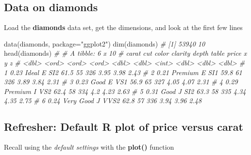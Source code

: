 \documentclass[
]{article}
\newenvironment{Shaded}{\begin{snugshade}}{\end{snugshade}}
\newcommand{\AttributeTok}[1]{\textcolor[rgb]{0.77,0.63,0.00}{#1}}
\newcommand{\CommentTok}[1]{\textcolor[rgb]{0.56,0.35,0.01}{\textit{#1}}}
\newcommand{\FunctionTok}[1]{\textcolor[rgb]{0.00,0.00,0.00}{#1}}
\newcommand{\NormalTok}[1]{#1}
\newcommand{\SpecialCharTok}[1]{\textcolor[rgb]{0.00,0.00,0.00}{#1}}
\newcommand{\StringTok}[1]{\textcolor[rgb]{0.31,0.60,0.02}{#1}}
\begin{document}
\hypertarget{data-on-diamonds}{%
\subsection{Data on diamonds}\label{data-on-diamonds}}

Load the \textbf{diamonds} data set, get the dimensions, and look at the
first few lines

\begin{Shaded}
\begin{Highlighting}[]
\FunctionTok{data}\NormalTok{(diamonds, }\AttributeTok{package=}\StringTok{"ggplot2"}\NormalTok{)}
\FunctionTok{dim}\NormalTok{(diamonds)}
\CommentTok{\# [1] 53940    10}
\FunctionTok{head}\NormalTok{(diamonds)}
\CommentTok{\# \# A tibble: 6 x 10}
\CommentTok{\#   carat cut       color clarity depth table price     x     y     z}
\CommentTok{\#   \textless{}dbl\textgreater{} \textless{}ord\textgreater{}     \textless{}ord\textgreater{} \textless{}ord\textgreater{}   \textless{}dbl\textgreater{} \textless{}dbl\textgreater{} \textless{}int\textgreater{} \textless{}dbl\textgreater{} \textless{}dbl\textgreater{} \textless{}dbl\textgreater{}}
\CommentTok{\# 1  0.23 Ideal     E     SI2      61.5    55   326  3.95  3.98  2.43}
\CommentTok{\# 2  0.21 Premium   E     SI1      59.8    61   326  3.89  3.84  2.31}
\CommentTok{\# 3  0.23 Good      E     VS1      56.9    65   327  4.05  4.07  2.31}
\CommentTok{\# 4  0.29 Premium   I     VS2      62.4    58   334  4.2   4.23  2.63}
\CommentTok{\# 5  0.31 Good      J     SI2      63.3    58   335  4.34  4.35  2.75}
\CommentTok{\# 6  0.24 Very Good J     VVS2     62.8    57   336  3.94  3.96  2.48}
\end{Highlighting}
\end{Shaded}

\hypertarget{refresher-default-r-plot-of-price-versus-carat}{%
\subsection{Refresher: Default R plot of price versus
carat}\label{refresher-default-r-plot-of-price-versus-carat}}

Recall using the \emph{default settings} with the \textbf{plot()}
function

\begin{Shaded}
\end{Shaded}
\end{document}
